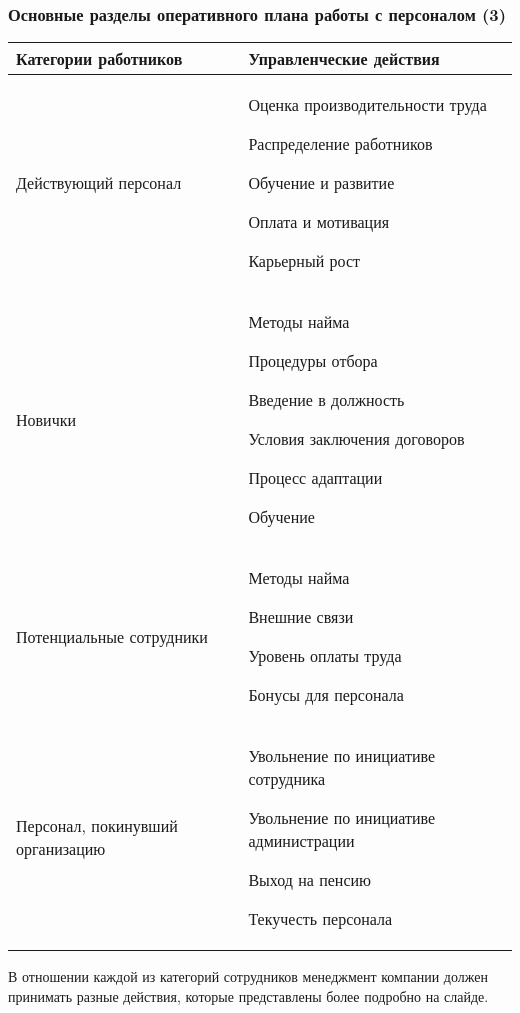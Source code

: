 \documentclass{../industrial-development}
\begin{document}
	\begin{frame} \frametitle{Основные разделы оперативного плана работы с персоналом (3)}
		\begin{table}[h]
			\begin{center}
				\begin{tabular}{|p{4cm}|p{5cm}|}
					\hline
					\tiny \textbf{Категории работников} & \tiny \textbf{Управленческие действия} \\
					\hline
					\tiny Действующий персонал & \tiny Оценка производительности труда
					
					Распределение работников
					
					Обучение и развитие
					
					Оплата и мотивация
					
					Карьерный рост
					\\
					\hline
					\tiny Новички & \tiny Методы найма
					
					Процедуры отбора
					
					Введение в должность
					
					Условия заключения договоров
					
					Процесс адаптации
					
					Обучение \\
					\hline
					\tiny Потенциальные сотрудники & \tiny Методы найма
					
					Внешние связи
					
					Уровень оплаты труда
					
					Бонусы для персонала \\
					\hline
					\tiny Персонал, покинувший организацию & \tiny Увольнение по инициативе сотрудника 
					
					Увольнение по инициативе администрации
					
					Выход на пенсию
					
					Текучесть персонала \\
					\hline
				\end{tabular}
			\end{center}
		\end{table}
		
	\end{frame}
	
	\lecturenotes
	
	В отношении каждой из категорий сотрудников менеджмент компании должен принимать разные действия, которые представлены более подробно на слайде.
	
\end{document}
